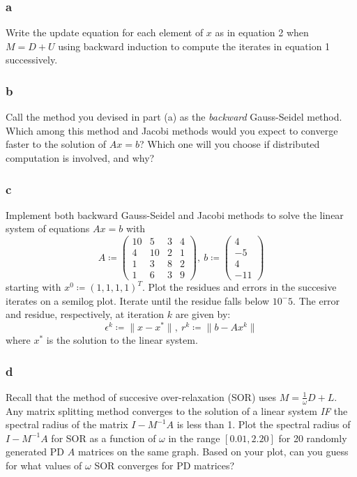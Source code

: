 \documentclass[11pt]{report}
\theoremstyle{definition}
\begin{document}
\subsubsection*{a}
Write the update equation for each element of $x$ as in equation 2 when $M=D+U$ using
backward induction to compute the iterates in equation 1 successively.

\subsubsection*{b}
Call the method you devised in part (a) as the \textit{backward} Gauss-Seidel
method. Which among this method and Jacobi methods would you expect to converge
faster to the solution of $Ax=b$? Which one will you choose if distributed
computation is involved, and why?

\subsubsection*{c}
Implement both backward Gauss-Seidel and Jacobi methods to solve the linear system of equations
$Ax=b$ with
\[
	A\coloneqq \begin{pmatrix}
		10 & 5  & 3 & 4 \\
		4  & 10 & 2 & 1 \\
		1  & 3  & 8 & 2 \\
		1  & 6  & 3 & 9
	\end{pmatrix},\
	b\coloneqq \begin{pmatrix}
		4 \\ -5 \\ 4 \\ -11
	\end{pmatrix}
\]
starting with $x^0\coloneqq (1,1,1,1)^T$. Plot the residues and errors in the
succesive iterates on a semilog plot. Iterate until the residue falls below $10^-5$. The error and residue, respectively, at iteration $k$ are given by:
\[ \epsilon^k\coloneqq \|x-x^*\|,\ r^k\coloneqq \|b-Ax^k\| \]
where $x^*$ is the solution to the linear system.

\subsubsection*{d}
Recall that the method of succesive over-relaxation (SOR) uses
$M=\frac{1}{\omega}D+L$. Any matrix splitting method converges to the solution
of a linear system \textit{IF} the spectral radius of the matrix $I-M^{-1}A$ is
less than 1. Plot the spectral radius of $I-M^{-1}A$ for SOR as a function of
$\omega$ in the range $[0.01, 2.20]$ for 20 randomly generated PD $A$ matrices
on the same graph. Based on your plot, can you guess for what values of $\omega$
SOR converges for PD matrices?
\end{document}
